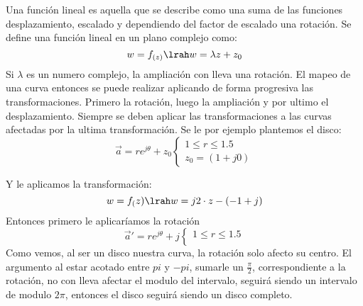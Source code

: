 \begin{figure}[H]
    \centering
    \begin{minipage}{0.49\textwidth}
    \centering
        
    \end{minipage}
    \begin{minipage}{0.49\textwidth}
    \centering
        
    \end{minipage}
    \caption{}
    \label{fig:RotF1}
\end{figure}
\begin{figure}[H]
    \centering
    
    \label{fig:RotF3}
\end{figure}
Una función lineal es aquella que se describe como una suma de las funciones desplazamiento, escalado y dependiendo del factor de escalado una rotación. Se define una función lineal en un plano complejo como:
\begin{equation}
    w=f_{(z)}\lrah w=\lambda z+z_0
\end{equation}
Si $\lambda$ es un numero complejo, la ampliación con lleva una rotación. El mapeo de una curva entonces se puede realizar aplicando de forma progresiva las transformaciones. Primero la rotación, luego la ampliación y por ultimo el desplazamiento. Siempre se deben aplicar las transformaciones a las curvas afectadas por la ultima transformación. Se le por ejemplo plantemos el disco:
\begin{equation}
    \Vec{a}=re^{j\theta}+z_0\begin{cases}
        1\leq r\leq1.5\\
        z_0=(1+j0)
    \end{cases}
\end{equation}
\begin{figure}[H]
    \centering
    
    \label{fig:LinF1}
\end{figure}
Y le aplicamos la transformación:
\begin{equation}
    w=f_(z)\lrah w=j2\cdot z-(-1+j)
\end{equation}
Entonces primero le aplicaríamos la rotación
\begin{equation}
    \vec{a}'=re^{j\theta}+j\begin{cases}
        1\leq r\leq1.5\\
    \end{cases}
\end{equation}
Como vemos, al ser un disco nuestra curva, la rotación solo afecto su centro. El argumento al estar acotado entre $pi$ y $-pi$, sumarle un $\frac{\pi}{2}$, correspondiente a la rotación, no con lleva afectar el modulo del intervalo, seguirá siendo un intervalo de modulo $2\pi$, entonces el disco seguirá siendo un disco completo. 

